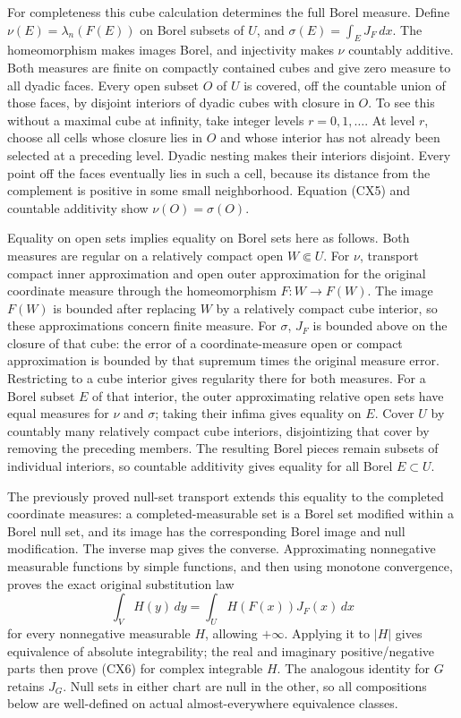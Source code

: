 \documentclass[
  11pt,
]{article}
\begin{document}
For completeness this cube calculation determines the full Borel
measure. Define \(\nu(E)=\lambda_n(F(E))\) on Borel subsets of \(U\),
and \(\sigma(E)=\int_E J_F\,dx\). The homeomorphism makes images Borel,
and injectivity makes \(\nu\) countably additive. Both measures are
finite on compactly contained cubes and give zero measure to all dyadic
faces. Every open subset \(O\) of \(U\) is covered, off the countable
union of those faces, by disjoint interiors of dyadic cubes with closure
in \(O\). To see this without a maximal cube at infinity, take integer
levels \(r=0,1,\ldots\). At level \(r\), choose all cells whose closure
lies in \(O\) and whose interior has not already been selected at a
preceding level. Dyadic nesting makes their interiors disjoint. Every
point off the faces eventually lies in such a cell, because its distance
from the complement is positive in some small neighborhood. Equation
(CX5) and countable additivity show \(\nu(O)=\sigma(O)\).

Equality on open sets implies equality on Borel sets here as follows.
Both measures are regular on a relatively compact open \(W\Subset U\).
For \(\nu\), transport compact inner approximation and open outer
approximation for the original coordinate measure through the
homeomorphism \(F:W\to F(W)\). The image \(F(W)\) is bounded after
replacing \(W\) by a relatively compact cube interior, so these
approximations concern finite measure. For \(\sigma\), \(J_F\) is
bounded above on the closure of that cube: the error of a
coordinate-measure open or compact approximation is bounded by that
supremum times the original measure error. Restricting to a cube
interior gives regularity there for both measures. For a Borel subset
\(E\) of that interior, the outer approximating relative open sets have
equal measures for \(\nu\) and \(\sigma\); taking their infima gives
equality on \(E\). Cover \(U\) by countably many relatively compact cube
interiors, disjointizing that cover by removing the preceding members.
The resulting Borel pieces remain subsets of individual interiors, so
countable additivity gives equality for all Borel \(E\subset U\).

The previously proved null-set transport extends this equality to the
completed coordinate measures: a completed-measurable set is a Borel set
modified within a Borel null set, and its image has the corresponding
Borel image and null modification. The inverse map gives the converse.
Approximating nonnegative measurable functions by simple functions, and
then using monotone convergence, proves the exact original substitution
law \[
 \int_V H(y)\,dy=\int_U H(F(x))J_F(x)\,dx                       \tag{CX6}
\] for every nonnegative measurable \(H\), allowing \(+\infty\).
Applying it to \(|H|\) gives equivalence of absolute integrability; the
real and imaginary positive/negative parts then prove (CX6) for complex
integrable \(H\). The analogous identity for \(G\) retains \(J_G\). Null
sets in either chart are null in the other, so all compositions below
are well-defined on actual almost-everywhere equivalence classes.
\end{document}
